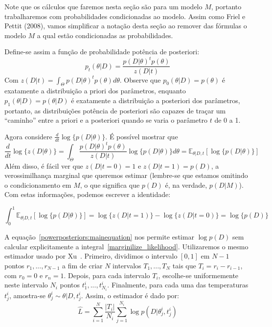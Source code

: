 \documentclass[12pt]{article}
\newcommand{\expectation}{\mathbb{E}}
\begin{document}
Note que os cálculos que faremos nesta seção são para um modelo $M$, 
portanto trabalharemos com probabilidades condicionadas ao modelo. Assim 
como Friel e Pettit (2008), vamos simplificar a notação desta seção ao 
remover das fórmulas o modelo $M$ a qual estão condicionadas as 
probabilidades.

Define-se assim a função de probabilidade potência de posteriori:
\begin{equation}
    p_t (\theta | D) = \frac{p (D | \theta) ^ t p (\theta)}{z(D | t)}
\end{equation}
Com $z(D | t) = \int_{\Theta} p(D | \theta) ^ t p(\theta)d\theta$.
Observe que $p_0 (\theta | D) = p(\theta)$ é exatamente a distribuição 
a priori dos parâmetros, enquanto $p_1 (\theta | D) = p(\theta | D)$ é
exatamente a distribuição a posteriori dos parâmetros, portanto, as 
distribuições potência de posteriori são capazes de traçar um ``caminho''
entre a priori e a posteriori quando se varia o parâmetro $t$ de 0 a 1.

Agora considere $\frac{d}{dt} \log\{p (D|\theta)\}$. É possível mostrar
que 
\begin{equation}
\frac{d}{dt}\log \{z (D | \theta)\} = 
\int_{\Theta}\frac{p(D|\theta)^tp(\theta)}{z(D|t)}\log\{p(D|\theta)\}d\theta
=\expectation_{\theta | D, t}[\log\{p (D|\theta)\}]
\end{equation}
Além disso, é fácil ver que $z(D| t = 0) = 1$ e $z (D| t = 1) = 
p(D)$, a verossimilhança marginal que queremos estimar (lembre-se que 
estamos omitindo o condicionamento em $M$, o que significa que $p(D)$ é, 
na verdade, $p (D | M)$). Com estas informações, podemos escrever a 
identidade:

\begin{equation}\label{powerposteriors:mainequation}
    \int_0^1\expectation_{\theta | D, t}[\log\{p(D | \theta)\}] = 
        \log\{z(D | t = 1)\} - \log\{z (D | t = 0)\} = \log \{p (D)\} 
\end{equation}

A equação~\ref{powerposteriors:mainequation} nos permite estimar 
$\log {p (D)}$ sem calcular explicitamente a 
integral~\ref{marginilize_likelihood}. Utilizaremos o mesmo estimador 
usado por Xu~\cite{Xu2010}. Primeiro, dividimos o intervalo $[0, 1]$ em 
$N - 1$ pontos $r_1, ..., r_{N - 1}$ a fim de criar $N$ intervalos
$T_1, ..., T_N$ tais que $T_i = r_i - r_{i - 1}$, com $r_0 = 0$ e 
$r_n = 1$. Depois, para cada intervalo $T_i$, escolhe-se uniformemente
neste intervalo $N_i$ pontos $t^i_{1}, ..., t^i_{N_i}$. Finalmente, para 
cada uma das temperaturas $t^i_j$, amostra-se $\theta^i_j \sim \theta | D, t^i_j$.
Assim, o estimador é dado por:
\begin{equation}\label{marginallikelihood_estimator}
    \hat{L} = \sum_{i = 1}^N \frac{|T_i|}{N_i} \sum_{j = 1}^{N_i} 
        \log {p (D | \theta^i_j, t^i_j)}
\end{equation}
\end{document}
